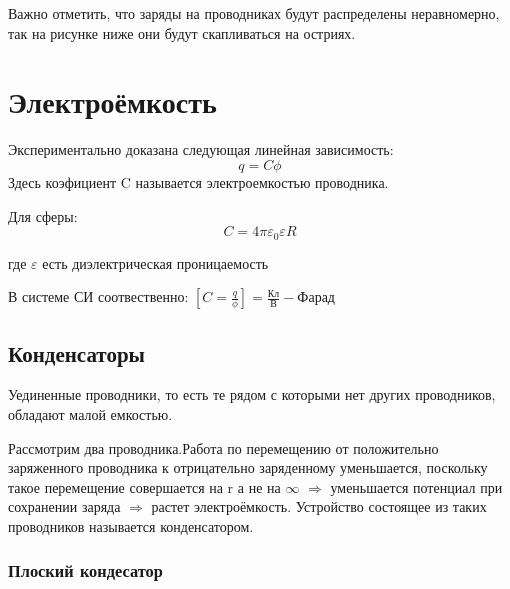 \documentclass[../main.tex]{subfiles}
\begin{document}
Важно отметить, что заряды на проводниках будут распределены неравномерно, так на рисунке ниже они будут скапливаться на остриях.

\section{Электроёмкость}
Экспериментально доказана следующая линейная зависимость:
\[q = C \phi\]
Здесь коэфициент C называется электроемкостью проводника.

Для сферы:
\[ C = 4 \pi \varepsilon_0 \varepsilon R\]
\begin{center}
    где $\varepsilon$ есть диэлектрическая проницаемость
\end{center}
В системе СИ соотвественно: $[C = \frac{q}{\phi}] = \frac{\text{Кл}}{\text{В}} - Фарад$
\subsection{Конденсаторы}
Уединенные проводники, то есть те рядом с которыми нет других проводников, обладают малой емкостью.

Рассмотрим два проводника.Работа по перемещению от положительно заряженного проводника к отрицательно заряденному уменьшается, поскольку
такое перемещение совершается на r а не на $\infty$ $\Rightarrow$ уменьшается потенциал при сохранении заряда $\Rightarrow$
растет электроёмкость.
Устройство состоящее из таких проводников называется конденсатором.


\subsubsection{Плоский кондесатор}
\end{document}
